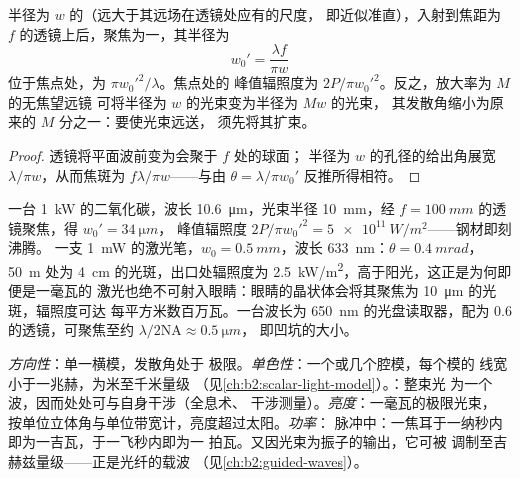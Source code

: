 \begin{proposition}[光束的聚焦与扩束]\label{prop:b2:laser:focus}
半径为 $w$ 的（远大于其远场在透镜处应有的尺度，
即近似准直），入射到焦距为
$f$ 的透镜上后，聚焦为一，其半径为
\[
w_0' = \frac{\lambda f}{\pi w}
\]
位于焦点处，为 $\pi w_0'^2/\lambda$。焦点处的
峰值辐照度为 $2P/\pi w_0'^2$。反之，放大率为 $M$ 的无焦望远镜
可将半径为 $w$ 的光束变为半径为 $Mw$ 的光束，
其发散角缩小为原来的 $M$ 分之一：要使光束远送，
须先将其扩束。
\end{proposition}

\begin{proof}
透镜将平面波前变为会聚于 $f$ 处的球面；
半径为 $w$ 的孔径的给出角展宽
$\lambda/\pi w$，从而焦斑为 $f\lambda/\pi w$——与由
$\theta = \lambda/\pi w_0'$ 反推所得相符。
\end{proof}

\begin{example}[切割、读取与指向]\label{ex:b2:laser:focus}
一台 \qty{1}{kW} 的二氧化碳，波长 \qty{10.6}{\micro m}，光束半径
\qty{10}{mm}，经 $f = \qty{100}{mm}$ 的透镜聚焦，得 $w_0' = \qty{34}{\micro m}$，
峰值辐照度 $2P/\pi w_0'^2 = \qty{5e11}{W/m^2}$——钢材即刻沸腾。
一支 \qty{1}{mW} 的激光笔，$w_0 = \qty{0.5}{mm}$，波长 \qty{633}{nm}：$\theta =
\qty{0.4}{mrad}$，\qty{50}{m} 处为 \qty{4}{cm} 的光斑，出口处辐照度为
\qty{2.5}{kW/m^2}，高于阳光，这正是为何即便是一毫瓦的
激光也绝不可射入眼睛：眼睛的晶状体会将其聚焦为
\qty{10}{\micro m} 的光斑，辐照度可达
每平方米数百万瓦。一台波长为 \qty{650}{nm} 的光盘读取器，配为
$0.6$ 的透镜，可聚焦至约 $\lambda/2\mathrm{NA} \approx \qty{0.5}{\micro m}$，
即凹坑的大小。
\end{example}

\begin{remark}[激光的特殊之处]\label{rem:b2:laser:special}
\emph{方向性}：单一横模，发散角处于
极限。\emph{单色性}：一个或几个腔模，每个模的
线宽小于一兆赫，为米至千米量级
（见\cref{ch:b2:scalar-light-model}）。\emph{}：整束光
为一个波，因而处处可与自身干涉（全息术、
干涉测量）。\emph{亮度}：一毫瓦的极限光束，
按单位立体角与单位带宽计，亮度超过太阳。\emph{功率}：
脉冲中：一焦耳于一纳秒内即为一吉瓦，于一飞秒内即为一
拍瓦。又因光束为振子的输出，它可被
调制至吉赫兹量级——正是光纤的载波
（见\cref{ch:b2:guided-waves}）。
\end{remark}

